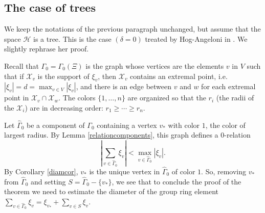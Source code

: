 \documentclass[11pt,letterpaper]{amsart}
\begin{document}
\subsection{The case of trees\label{hogangeloniproof}}




We keep the notations of the previous paragraph unchanged, but assume that
the space $\mathcal{H}$ is a tree. This is the case $(\delta = 0)$ treated by
Hog-Angeloni in {\cite{hogangeloni}}. We slightly rephrase her proof.

Recall that $\Gamma_0 = \Gamma_0 (\Xi)$ is the graph whose vertices are the
elements $v$ in $V$ such that if $\mathcal X_v$ is the support of $\xi_v$, then $\mathcal X_v$
contains an extremal point, i.e. $| \xi_v | = d = \max_{v \in V} | \xi_v |$,
and there is an edge between $v$ and $w$ for each extremal point in $\mathcal X_v\cap\mathcal X_w$. %
The colors $\{ 1, \ldots, n \}$ are organized so that the $r_i$
(the radii of the $\mathcal X_i$) are in decreasing order: $r_1 \geq \cdots
\geq r_n$.

Let $\hat{\Gamma}_0$ be a component of $\Gamma_0$ containing a vertex $v_*$
with color $1$, the color of largest radius. By Lemma \ref{relationcomponents}, this graph defines a $0$-relation
\[ \left| \sum_{v \in \hat{\Gamma}_0} \xi_v \right| < \max_{v \in
\hat{\Gamma}_0} | \xi_v | . \]
By Corollary \ref{diamcor}, $v_*$ is the unique vertex in $\hat{\Gamma}_0$ of color $1$. So, removing $v_*$ from $\hat\Gamma_0$ and setting $S =
\hat{\Gamma}_0 - \{v_*\}$, we see that to conclude the proof of the theorem we need to estimate the diameter of the group ring element $\sum_{v\in\hat\Gamma_0}\xi_v=\xi_{v_*}+\sum_{v\in S}\xi_v$. 
\end{document}
